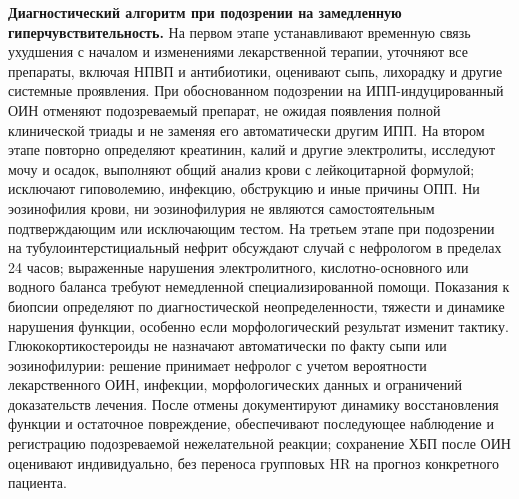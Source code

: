 \documentclass[11pt,a4paper,notitlepage]{report}
\newcommand{\src}[1]{\unskip\space\cite{#1}}
\begin{document}
\textbf{Диагностический алгоритм при подозрении на замедленную гиперчувствительность.} На первом этапе устанавливают временную связь ухудшения с началом и изменениями лекарственной терапии, уточняют все препараты, включая НПВП и антибиотики, оценивают сыпь, лихорадку и другие системные проявления. При обоснованном подозрении на ИПП-индуцированный ОИН отменяют подозреваемый препарат, не ожидая появления полной клинической триады и не заменяя его автоматически другим ИПП.\src{uslabel} На втором этапе повторно определяют креатинин, калий и другие электролиты, исследуют мочу и осадок, выполняют общий анализ крови с лейкоцитарной формулой; исключают гиповолемию, инфекцию, обструкцию и иные причины ОПП. Ни эозинофилия крови, ни эозинофилурия не являются самостоятельным подтверждающим или исключающим тестом.\src{renalniceaki,renaleosin2013} На третьем этапе при подозрении на тубулоинтерстициальный нефрит обсуждают случай с нефрологом в пределах 24 часов; выраженные нарушения электролитного, кислотно-основного или водного баланса требуют немедленной специализированной помощи. Показания к биопсии определяют по диагностической неопределенности, тяжести и динамике нарушения функции, особенно если морфологический результат изменит тактику.\src{renalniceaki} Глюкокортикостероиды не назначают автоматически по факту сыпи или эозинофилурии: решение принимает нефролог с учетом вероятности лекарственного ОИН, инфекции, морфологических данных и ограничений доказательств лечения. После отмены документируют динамику восстановления функции и остаточное повреждение, обеспечивают последующее наблюдение и регистрацию подозреваемой нежелательной реакции; сохранение ХБП после ОИН оценивают индивидуально, без переноса групповых HR на прогноз конкретного пациента.\src{renalsteroids2018,renalkdigo2024}
\end{document}
